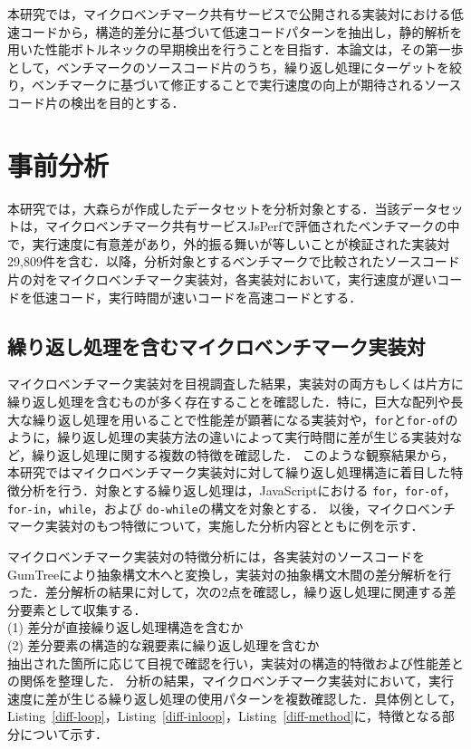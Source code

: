 \documentclass[submit,techrep,noauthor]{ipsj}
\newcommand{\todo}[1]{\colorbox{yellow}{{\bf TODO}:}{\color{red} {\textbf{[#1]}}}}
\begin{document}
本研究では，マイクロベンチマーク共有サービスで公開される実装対における低速コードから，構造的差分に基づいて低速コードパターンを抽出し，静的解析を用いた性能ボトルネックの早期検出を行うことを目指す．本論文は，その第一歩として，ベンチマークのソースコード片のうち，繰り返し処理にターゲットを絞り，ベンチマークに基づいて修正することで実行速度の向上が期待されるソースコード片の検出を目的とする．



\section{事前分析}
\label{sec:pre-analysis}


本研究では，大森ら\cite{omori}が作成したデータセットを分析対象とする．当該データセットは，マイクロベンチマーク共有サービスJsPerfで評価されたベンチマークの中で，実行速度に有意差があり，外的振る舞いが等しいことが検証された実装対29,809件を含む．以降，分析対象とするベンチマークで比較されたソースコード片の対をマイクロベンチマーク実装対，各実装対において，実行速度が遅いコードを低速コード，実行時間が速いコードを高速コードとする．

\subsection{繰り返し処理を含むマイクロベンチマーク実装対}
\label{section3.1}


マイクロベンチマーク実装対を目視調査した結果，実装対の両方もしくは片方に繰り返し処理を含むものが多く存在することを確認した．特に，巨大な配列や長大な繰り返し処理を用いることで性能差が顕著になる実装対や，\texttt{for}と\texttt{for-of}のように，繰り返し処理の実装方法の違いによって実行時間に差が生じる実装対など，繰り返し処理に関する複数の特徴を確認した．
このような観察結果から，本研究ではマイクロベンチマーク実装対に対して繰り返し処理構造に着目した特徴分析を行う．対象とする繰り返し処理は，JavaScriptにおける \texttt{for}，\texttt{for-of}，\texttt{for-in}，\texttt{while}，および \texttt{do-while}の構文を対象とする．
以後，マイクロベンチマーク実装対のもつ特徴について，実施した分析内容とともに例を示す．

マイクロベンチマーク実装対の特徴分析には，各実装対のソースコードをGumTree\cite{gumtree}により抽象構文木へと変換し，実装対の抽象構文木間の差分解析を行った．差分解析の結果に対して，次の2点を確認し，繰り返し処理に関連する差分要素として収集する．\\
\noindent(1) 差分が直接繰り返し処理構造を含むか\\
\noindent(2) 差分要素の構造的な親要素に繰り返し処理を含むか\\
抽出された箇所に応じて目視で確認を行い，実装対の構造的特徴および性能差との関係を整理した．
分析の結果，マイクロベンチマーク実装対において，実行速度に差が生じる繰り返し処理の使用パターンを複数確認した．具体例として，Listing~\ref{diff-loop}，Listing~\ref{diff-inloop}，Listing~\ref{diff-method}に，特徴となる部分について示す．
\end{document}
